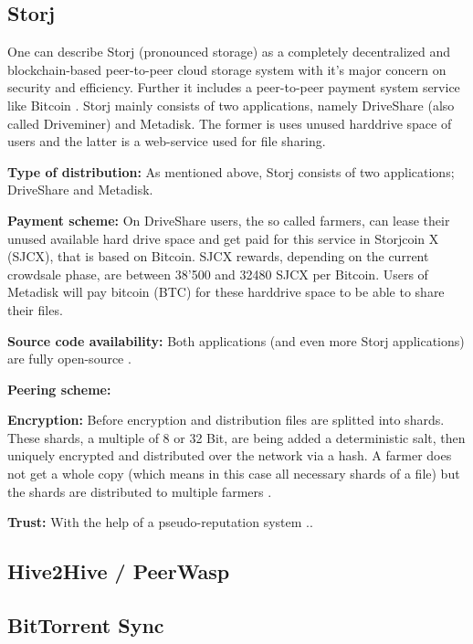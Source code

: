 \subsection{Storj} %
One can describe Storj (pronounced storage) as a completely decentralized and blockchain-based peer-to-peer
cloud storage system with it's major concern on security and efficiency. Further
it includes a peer-to-peer payment system service like Bitcoin \cite{storj:blog:what_is_storj}.
Storj mainly consists of two applications, namely DriveShare (also called Driveminer)
and Metadisk. The former is uses unused harddrive space of users and the latter is a
web-service used for file sharing.

\textbf{Type of distribution:} As mentioned above, Storj consists of two applications;
DriveShare and Metadisk.

\textbf{Payment scheme:} On DriveShare users, the so called farmers, can lease their unused
available hard drive space and get paid for this service in Storjcoin X (SJCX), that is
based on Bitcoin. SJCX rewards, depending on the current crowdsale phase, are between
38'500 and 32480 SJCX per Bitcoin\cite{storj:crowdsale}. Users of Metadisk will pay
bitcoin (BTC) for these harddrive space to be able to share their files.

\textbf{Source code availability:} Both applications (and even more Storj applications)
are fully open-source \cite{storj:github}.

\textbf{Peering scheme:}

\textbf{Encryption:} Before encryption and distribution files are splitted into shards.
These shards, a multiple of 8 or 32 Bit, are being added a deterministic salt, then uniquely
encrypted and distributed over the network via a hash. A farmer does not get a whole copy
(which means in this case all necessary shards of a file) but the shards are distributed
to multiple farmers \cite{storj:PDF}.

\textbf{Trust:} With the help of a pseudo-reputation system ..

\subsection{Hive2Hive / PeerWasp} %

\subsection{BitTorrent Sync} %

